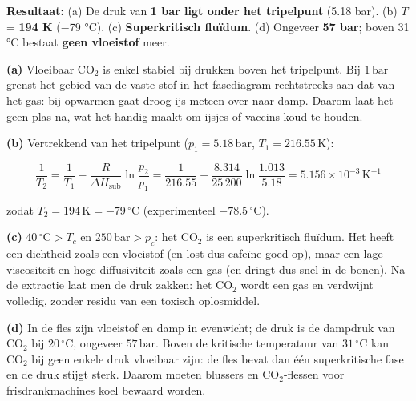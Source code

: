 \begin{oplossing}
\textbf{Resultaat:} (a) De druk van \textbf{1 bar ligt onder het tripelpunt} (5.18 bar). (b) \(T\) = \textbf{194 K} (\ensuremath{-}79 °C). (c) \textbf{Superkritisch fluïdum}. (d) Ongeveer \textbf{57 bar}; boven 31 °C bestaat \textbf{geen vloeistof} meer.

\textbf{(a)} Vloeibaar \(\mathrm{CO_2}\) is enkel stabiel bij drukken boven het tripelpunt. Bij \(1\,\mathrm{bar}\) grenst het gebied van de vaste stof in het fasediagram rechtstreeks aan dat van het gas: bij opwarmen gaat droog ijs meteen over naar damp. Daarom laat het geen plas na, wat het handig maakt om ijsjes of vaccins koud te houden.

\textbf{(b)} Vertrekkend van het tripelpunt (\(p_1 = 5.18\,\mathrm{bar}\), \(T_1 = 216.55\,\mathrm{K}\)):

\[
\frac{1}{T_2} = \frac{1}{T_1} - \frac{R}{\Delta H_{\text{sub}}}\ln\frac{p_2}{p_1} = \frac{1}{216.55} - \frac{8.314}{25\,200}\ln\frac{1.013}{5.18} = 5.156\times10^{-3}\,\mathrm{K^{-1}}
\]

zodat \(T_2 = 194\,\mathrm{K} = -79\,^\circ\mathrm{C}\) (experimenteel \(-78.5\,^\circ\mathrm{C}\)).

\textbf{(c)} \(40\,^\circ\mathrm{C} > T_c\) en \(250\,\mathrm{bar} > p_c\): het \(\mathrm{CO_2}\) is een superkritisch fluïdum. Het heeft een dichtheid zoals een vloeistof (en lost dus cafeïne goed op), maar een lage viscositeit en hoge diffusiviteit zoals een gas (en dringt dus snel in de bonen). Na de extractie laat men de druk zakken: het \(\mathrm{CO_2}\) wordt een gas en verdwijnt volledig, zonder residu van een toxisch oplosmiddel.

\textbf{(d)} In de fles zijn vloeistof en damp in evenwicht; de druk is de dampdruk van \(\mathrm{CO_2}\) bij \(20\,^\circ\mathrm{C}\), ongeveer \(57\,\mathrm{bar}\). Boven de kritische temperatuur van \(31\,^\circ\mathrm{C}\) kan \(\mathrm{CO_2}\) bij geen enkele druk vloeibaar zijn: de fles bevat dan één superkritische fase en de druk stijgt sterk. Daarom moeten blussers en \(\mathrm{CO_2}\)-flessen voor frisdrankmachines koel bewaard worden.
\end{oplossing}

